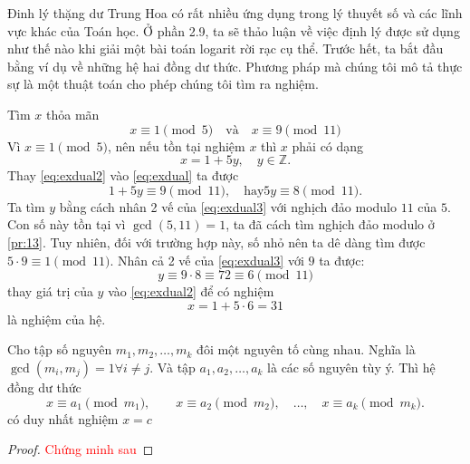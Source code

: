 Đinh lý thặng dư Trung Hoa có rất nhiều ứng dụng trong lý thuyết số và các lĩnh vực khác của Toán học. Ở phần 2.9, ta sẽ thảo luận về việc định lý được sử dụng như thế nào khi giải một bài toán logarit rời rạc cụ thể.
Trước hết, ta bắt đầu bằng ví dụ về những hệ hai đồng dư thức. Phương pháp mà chúng tôi mô tả thực sự là một thuật toán cho phép chúng tôi tìm ra nghiệm.

\begin{example}
	Tìm $x$ thỏa mãn
	\begin{equation}
		\label{eq:exdual}
		x \equiv 1 \pmod{5} \quad \text{và} \quad x \equiv 9 \pmod{11}
	\end{equation}
	Vì $x \equiv 1 \pmod{5}$, nên nếu tồn tại nghiệm $x$ thì $x$ phải có dạng
	\begin{equation}
		\label{eq:exdual2}
		x = 1 + 5y, \quad y \in \mathbb{Z}.
	\end{equation}
	Thay \eqref{eq:exdual2} vào \eqref{eq:exdual} ta được
	\begin{equation}
		\label{eq:exdual3}
		1 + 5y \equiv 9 \pmod{11}, \quad \text{hay} 5y \equiv 8 \pmod{11}.
	\end{equation}
	Ta tìm $y$ bằng cách nhân 2 vế của \eqref{eq:exdual3} với nghịch đảo modulo $11$ của $5$. Con số này tồn tại vì $\gcd (5,11) = 1$, ta đã cách tìm nghịch đảo modulo ở \ref{pr:13}.
	Tuy nhiên, đối với trường hợp này, số nhỏ nên ta dê dàng tìm được $5\cdot 9 \equiv 1 \pmod{11}$.
	Nhân cả 2 vế của \eqref{eq:exdual3} với $9$ ta được:
	\begin{equation}
		\label{eq:exdual4}
		y \equiv 9 \cdot 8 \equiv 72 \equiv 6 \pmod{11}
	\end{equation}
	thay giá trị của $y$ vào \eqref{eq:exdual2} để có nghiệm
	$$ x = 1+ 5\cdot 6 = 31$$
	là nghiệm của hệ.
\end{example}

\begin{theorem}
	Cho tập số nguyên $m_1, m_2, \ldots, m_k$ đôi một nguyên tố cùng nhau. Nghĩa là $\gcd (m_i, m_j) = 1 \forall i \neq j$.
	Và tập $a_1, a_2, \ldots, a_k$ là các số nguyên tùy ý. Thì hệ đồng dư thức
	\begin{equation}
		x \equiv a_1 \pmod{m_1}, \quad \quad x \equiv a_2 \pmod{m_2}, \quad \ldots, \quad x \equiv a_k \pmod{m_k}.
	\end{equation}
	có duy nhất nghiệm $x=c$
\end{theorem}
\begin{proof}
	\textcolor{red}{Chứng minh sau}
\end{proof}


